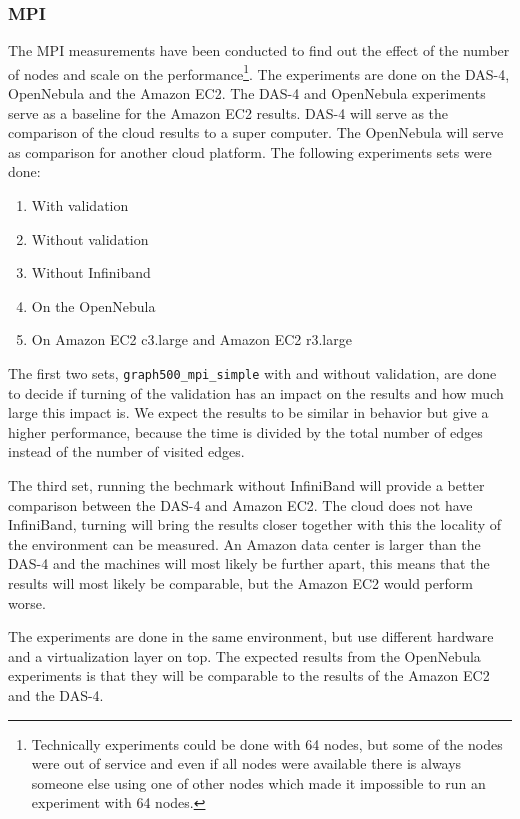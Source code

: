 \subsubsection{MPI}
The MPI measurements have been conducted to find out the effect of the number of nodes and scale on the performance\footnote{Technically experiments could be done with 64 nodes, but some of the nodes were out of service and even if all nodes were available there is always someone else using one of other nodes which made it impossible to run an experiment with 64 nodes.}.
The experiments are done on the DAS-4, OpenNebula and the Amazon EC2. The DAS-4 and OpenNebula experiments serve as a baseline for the Amazon EC2 results. DAS-4 will serve as the comparison of the cloud results to a super computer. The OpenNebula will serve as comparison for another cloud platform. The following experiments sets were done:
\begin{enumerate}
	\item With validation
	\item Without validation
	\item Without Infiniband
	\item On the OpenNebula
	\item On Amazon EC2 c3.large and Amazon EC2 r3.large 
\end{enumerate}

The first two sets, \texttt{graph500\_mpi\_simple} with and without validation, are done to decide if turning of the validation has an impact on the results and how much large this impact is. We expect the results to be similar in behavior but give a higher performance, because the time is divided by the total number of edges instead of the number of visited edges.

The third set, running the bechmark without InfiniBand will provide a better comparison between the DAS-4 and Amazon EC2. The cloud does not have InfiniBand, turning will bring the results closer together with this the locality of the environment can be measured. An Amazon data center is larger than the DAS-4 and the machines will most likely be further apart, this means that the results will most likely be comparable, but the Amazon EC2 would perform worse.

The experiments are done in the same environment, but use different hardware and a virtualization layer on top. The expected results from the OpenNebula experiments is that they will be comparable to the results of the Amazon EC2 and the DAS-4. 

